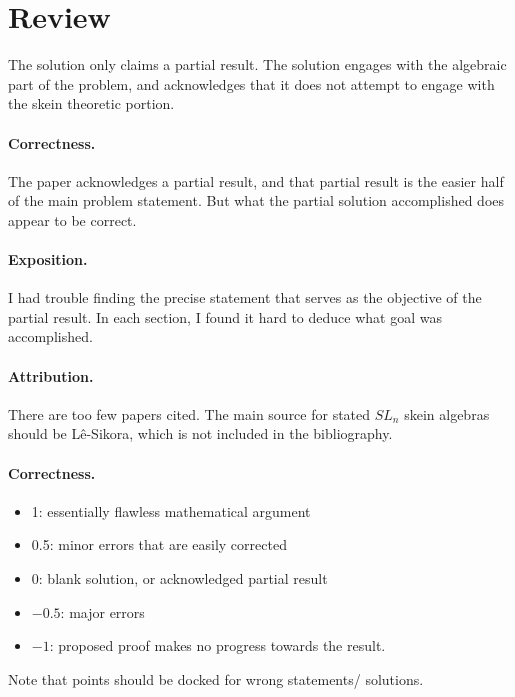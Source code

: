 \documentclass[11pt]{article}
\theoremstyle{definition}
\theoremstyle{remark}
\begin{document}
\maketitle

\section{Review}
The solution only claims a partial result. The solution engages with the algebraic part of the problem, and acknowledges that it does not attempt to engage with the skein theoretic portion. 

\paragraph{Correctness.}
The paper acknowledges a partial result, and that partial result is the easier half of the main problem statement. But what the partial solution accomplished does appear to be correct.

\paragraph{Exposition.}
I had trouble finding the precise statement that serves as the objective of the partial result. In each section, I found it hard to deduce what goal was accomplished.

\paragraph{Attribution.}

There are too few papers cited. The main source for stated $SL_n$ skein algebras should be L\^{e}-Sikora, which is not included in the bibliography. 

\paragraph{Correctness.}
\begin{itemize}
	\item  1: essentially flawless mathematical argument
	\item  0.5: minor errors that are easily corrected
	\item  0: blank solution, or acknowledged partial result
	\item  $-0.5$: major errors
	\item  $-1$: proposed proof makes no progress towards the result.
\end{itemize}
Note that points should be docked for wrong statements/ solutions.
\end{document}

